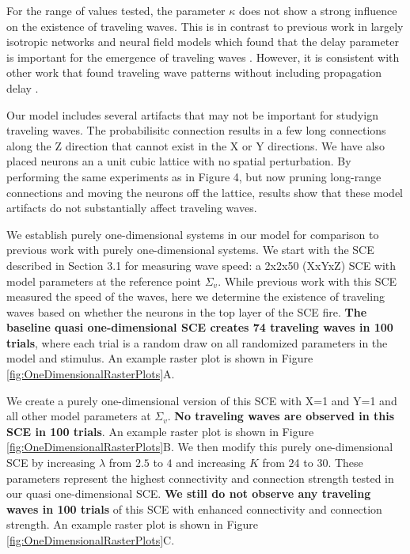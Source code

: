 For the range of values tested, the parameter $\kappa$ does not show a strong influence on the existence of traveling waves. 
This is in contrast to previous work in largely isotropic networks and neural field models which found that the delay parameter is important for the emergence of traveling waves \citet{Senk2020}\citet{Atay2006}\citet{Roxin2005}.
However, it is consistent with other work that found traveling wave patterns without including propagation delay \citet{Folias2012}\citet{Wyller2007}.

Our model includes several artifacts that may not be important for studyign traveling waves.
The probabilisitc connection results in a few long connections along the Z direction that cannot exist in the X or Y directions.
We have also placed neurons an a unit cubic lattice with no spatial perturbation.
By performing the same experiments as in Figure 4, but now pruning long-range connections and moving the neurons off the lattice, 
results show that these model artifacts do not substantially affect traveling waves.

We establish purely one-dimensional systems in our model for comparison to previous work with purely one-dimensional systems.
We start with the SCE described in Section 3.1 for measuring wave speed: a 2x2x50 (XxYxZ) SCE with model parameters at the reference point $\Sigma_v$. 
While previous work with this SCE measured the speed of the waves, here we determine the existence of traveling waves based on whether the neurons in the top layer of the SCE fire.
\textbf{The baseline quasi one-dimensional SCE creates 74 traveling waves in 100 trials}, where each trial is a random draw on all randomized parameters in the model and stimulus.
An example raster plot is shown in Figure \ref{fig:OneDimensionalRasterPlots}A.

We create a purely one-dimensional version of this SCE with X=1 and Y=1 and all other model parameters at $\Sigma_v$.
\textbf{No traveling waves are observed in this SCE in 100 trials}. 
An example raster plot is shown in Figure \ref{fig:OneDimensionalRasterPlots}B.
We then modify this purely one-dimensional SCE by increasing $\lambda$ from $2.5$ to $4$ and increasing $K$ from $2$4 to $30$.
These parameters represent the highest connectivity and connection strength tested in our quasi one-dimensional SCE.
\textbf{We still do not observe any traveling waves in 100 trials} of this SCE with enhanced connectivity and connection strength.
An example raster plot is shown in Figure \ref{fig:OneDimensionalRasterPlots}C.

